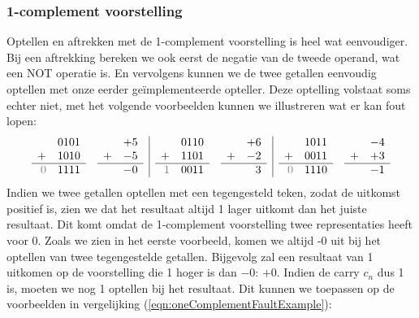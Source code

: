 \subsubsection{1-complement voorstelling}
Optellen en aftrekken met de 1-complement voorstelling is heel wat eenvoudiger. Bij een aftrekking bereken we ook eerst de negatie van de tweede operand, wat een NOT operatie is. En vervolgens kunnen we de twee getallen eenvoudig optellen met onze eerder ge\"implementeerde opteller. Deze optelling volstaat soms echter niet, met het volgende voorbeelden kunnen we illustreren wat er kan fout lopen:
\begin{equation}
\begin{array}{rl|rl|rl}
\begin{array}{rr}
&0101\\
+&1010\\\hline
\textcolor{gray}{0}&1111
\end{array}
&
\begin{array}{rr}
&+5\\
+&-5\\\hline
&-0
\end{array}
&
\begin{array}{rr}
&0110\\
+&1101\\\hline
\textcolor{gray}{1}&0011
\end{array}
&
\begin{array}{rr}
&+6\\
+&-2\\\hline
&3
\end{array}
&
\begin{array}{rr}
&1011\\
+&0011\\\hline
\textcolor{gray}{0}&1110
\end{array}
&
\begin{array}{rr}
&-4\\
+&+3\\\hline
&-1
\end{array}
\end{array}
\label{eqn:oneComplementFaultExample}
\end{equation}
Indien we twee getallen optellen met een tegengesteld teken, zodat de uitkomst positief is, zien we dat het resultaat altijd 1 lager uitkomt dan het juiste resultaat. Dit komt omdat de 1-complement voorstelling twee representaties heeft voor 0. Zoals we zien in het eerste voorbeeld, komen we altijd -0 uit bij het optellen van twee tegengestelde getallen. Bijgevolg zal een resultaat van 1 uitkomen op de voorstelling die 1 hoger is dan $-0$: $+0$. Indien de carry $c_n$ dus 1 is, moeten we nog 1 optellen bij het resultaat. Dit kunnen we toepassen op de voorbeelden in vergelijking (\ref{eqn:oneComplementFaultExample}):
